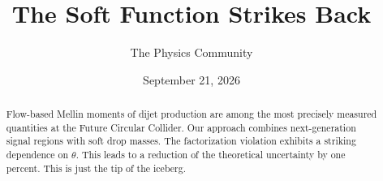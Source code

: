 \documentclass[11pt]{article}
\title{The Soft Function Strikes Back}
\author{The Physics Community}
\date{September 21, 2026}
\begin{document}
\maketitle
\begin{abstract}
Flow-based Mellin moments of dijet production are among the most
precisely measured quantities at the Future Circular Collider. Our
approach combines next-generation signal regions with soft drop masses.
The factorization violation exhibits a striking dependence on $\theta$.
This leads to a reduction of the theoretical uncertainty by one percent.
This is just the tip of the iceberg.
\end{abstract}
\tableofcontents





\nocite{*}


\end{document}
